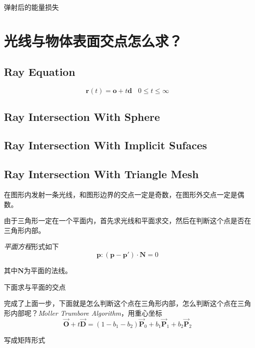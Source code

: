 弹射后的能量损失

\section{光线与物体表面交点怎么求？}

\subsection*{Ray Equation}

\begin{equation}
    \mathbf{r}(t)=\mathbf{o}+t\mathbf{d}\ \ \ \ 0\leqslant t\leqslant \infty
\end{equation}

\subsection*{Ray Intersection With Sphere}

\subsection*{Ray Intersection With Implicit Sufaces}

\subsection*{Ray Intersection With Triangle Mesh}

在图形内发射一条光线，和图形边界的交点一定是奇数，在图形外交点一定是偶数。

由于三角形一定在一个平面内，首先求光线和平面求交，然后在判断这个点是否在三角形内部。

\textsl{平面方程}形式如下
\begin{equation}
    \mathbf{p}:(\mathbf{p}-\mathbf{p}')\cdot \mathbf{N}=0
\end{equation}

其中$\mathbf{N}$为平面的法线。

下面求与平面的交点

完成了上面一步，下面就是怎么判断这个点在三角形内部，怎么判断这个点在三角形内部呢？\textsl{M$\ddot{o}$ller Trumbore Algorithm}，用重心坐标
\begin{equation}
    \overrightarrow{\mathbf{O}}+t\overrightarrow{\mathbf{D}}=(1-b_1-b_2)\overrightarrow{\mathbf{P}}_0
    +b_1\overrightarrow{\mathbf{P}}_1+b_2\overrightarrow{\mathbf{P}}_2
\end{equation}

写成矩阵形式

